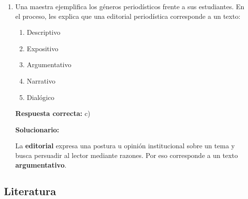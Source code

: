 \begin{enumerate}[resume]
	\vspace{2mm}
	\textbf{Solucionario:}
	
	La oración correcta es: \textit{No podrás convencerla si tú no le das seguridad; anímala porque es tu hija}.\\
	Por tanto, la secuencia es \textbf{la -- le -- la}.
	
	\vspace{6mm}
	
	\item Una maestra ejemplifica los géneros periodísticos frente a sus estudiantes. En el proceso, les explica que una editorial periodística corresponde a un texto:
	\begin{enumerate}[label=\alph*)]
		\item Descriptivo
		\item Expositivo
		\item Argumentativo
		\item Narrativo
		\item Dialógico
	\end{enumerate}
	\textbf{Respuesta correcta:} c)
	
	\vspace{2mm}
	\textbf{Solucionario:}
	
	La \textbf{editorial} expresa una postura u opinión institucional sobre un tema y busca persuadir al lector mediante razones. Por eso corresponde a un texto \textbf{argumentativo}.
	
	\vspace{6mm}
	
\end{enumerate}

\subsection*{Literatura}

